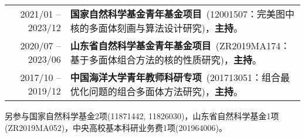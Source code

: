 %
%



 \begin{tabular}{rl}	
	2021/01 -- 2023/12  & %
	{\textbf{国家自然科学基金青年基金项目}}~(12001507：完美图中核的多面体刻画与算法设计研究)，\textbf{主持}。\\
	2020/07 -- 2023/06  & %
	{\textbf{山东省自然科学基金青年基金项目}}~(ZR2019MA174：基于多面体组合方法的核的性质研究)，\textbf{主持}。\\
	2017/10 -- 2019/12 	& %
	{\textbf{中国海洋大学青年教师科研专项}}~(201713051：组合最优化问题的组合多面体方法研究)，\textbf{主持}。
\end{tabular}

另参与国家自然科学基金2项(11871442, 11826030)，山东省自然科学基金1项(ZR2019MA052)，中央高校基本科研业务费1项(201964006)。